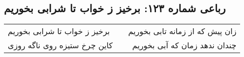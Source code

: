 \begin{center}
\section*{رباعی شماره ۱۲۳: برخیز ز خواب تا شرابی بخوریم}
\label{sec:sh123}
\begin{longtable}{l p{0.5cm} r}
برخیز ز خواب تا شرابی بخوریم
&&
زان پیش که از زمانه تابی بخوریم
\\
کاین چرخ ستیزه روی ناگه روزی
&&
چندان ندهد زمان که آبی بخوریم
\\
\end{longtable}
\end{center}
